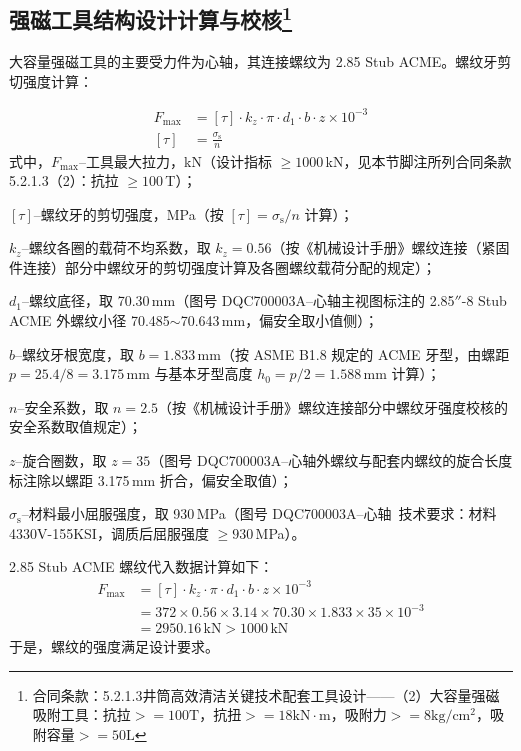 \subsection[强磁工具结构设计计算与校核]{强磁工具结构设计计算与校核\protect\footnote{合同条款：5.2.1.3井筒高效清洁关键技术配套工具设计——（2）大容量强磁吸附工具：抗拉$>=100\mathrm{T}$，抗扭$>=18 \mathrm{kN}\cdot \mathrm{m}$，吸附力$>=8\mathrm{kg/cm^2}$，吸附容量$>=50\mathrm{L}$}}\label{sec:mag_tool_check}


大容量强磁工具的主要受力件为心轴，其连接螺纹为 2.85 Stub ACME。螺纹牙剪切强度计算：

\begin{equation}
    \begin{aligned}
        F_{\max} &= [\tau] \cdot k_z \cdot \pi \cdot d_1 \cdot b \cdot z \times 10^{-3} \\
        [\tau] &= \frac{\sigma_{\mathrm{s}}}{n}
    \end{aligned}
\end{equation}
式中，$F_{\max}$--工具最大拉力，kN（设计指标 $\ge 1000$\,kN，见本节脚注所列合同条款 5.2.1.3（2）：抗拉 $\ge 100$\,T）；

$[\tau]$--螺纹牙的剪切强度，MPa（按 $[\tau]=\sigma_{\mathrm{s}}/n$ 计算）；

$k_z$--螺纹各圈的载荷不均系数，取 $k_z = 0.56$（按《机械设计手册》螺纹连接（紧固件连接）部分中螺纹牙的剪切强度计算及各圈螺纹载荷分配的规定\cite{ref26}）；

$d_1$--螺纹底径，取 70.30\,mm（图号 DQC700003A--心轴主视图标注的 2.85$''$-8 Stub ACME 外螺纹小径 70.485$\sim$70.643\,mm，偏安全取小值侧）；

$b$--螺纹牙根宽度，取 $b = 1.833\,\text{mm}$（按 ASME B1.8 规定的 ACME 牙型，由螺距 $p=25.4/8=3.175\,\text{mm}$ 与基本牙型高度 $h_0=p/2=1.588\,\text{mm}$ 计算）；

$n$--安全系数，取 $n = 2.5$（按《机械设计手册》螺纹连接部分中螺纹牙强度校核的安全系数取值规定\cite{ref26}）；

$z$--旋合圈数，取 $z = 35$（图号 DQC700003A--心轴外螺纹与配套内螺纹的旋合长度标注除以螺距 3.175\,mm 折合，偏安全取值）；

$\sigma_{\mathrm{s}}$--材料最小屈服强度，取 930\,MPa（图号 DQC700003A--心轴\ 技术要求：材料 4330V-155KSI，调质后屈服强度 $\ge 930$\,MPa）。


2.85 Stub ACME 螺纹代入数据计算如下：
\begin{equation}
    \begin{aligned}
        F_{\max} &= [\tau] \cdot k_z \cdot \pi \cdot d_1 \cdot b \cdot z \times 10^{-3} \\
                &= 372 \times 0.56 \times 3.14 \times 70.30 \times 1.833 \times 35 \times 10^{-3} \\
                &= 2950.16 \, \text{kN} > 1000 \, \text{kN}
    \end{aligned}
\end{equation}
于是，螺纹的强度满足设计要求。

